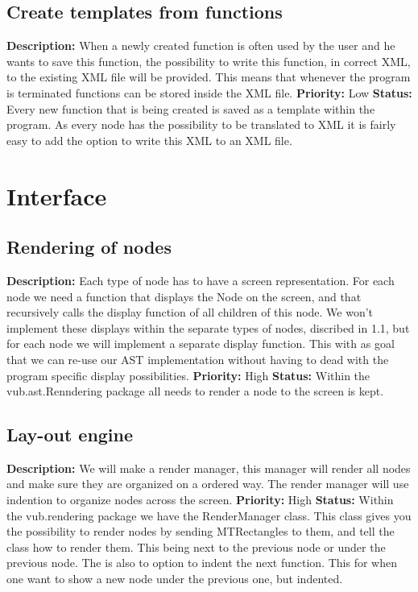 \documentclass[a4paper,12pt]{report}
\begin{document}
\subsection{Create templates from functions}
\textbf{Description: } When a newly created function is often used by the user and he wants to save this function, the possibility to write this function, in correct XML, to
the existing XML file will be provided. This means that whenever the program is terminated functions can be stored inside the XML file.\newline
\textbf{Priority:} Low \newline
\textbf{Status: } Every new function that is being created is saved as a template within the program. As every node has the possibility to be translated to XML it is fairly easy to add the option to write this XML to 
an XML file.\newline
\section{Interface}
\subsection{Rendering of nodes}
\textbf{Description: }Each type of node has to have a screen representation. For each node we need a function that displays the Node on the screen, and 
that recursively calls the display function of all children of this node. We won't implement these displays within the separate types of nodes, discribed in 1.1, but 
for each node we will implement a separate display function. This with as goal that we can re-use our AST implementation without having to dead
with the program specific display possibilities.  \newline
\textbf{Priority:} High \newline
\textbf{Status: } Within the vub.ast.Renndering package all needs to render a node to the screen is kept. \newline
\subsection{Lay-out engine}
\textbf{Description: } We will make a render manager, this manager will render all nodes and make sure they are organized on a ordered way. The render manager will use
indention to organize nodes across the screen.
\textbf{Priority:} High \newline
\textbf{Status: } Within the vub.rendering package we have the RenderManager class. This class gives you the possibility to render nodes
by sending MTRectangles to them, and tell the class how to render them. This being next to the previous node or under the previous node. 
The is also to option to indent the next function. This for when one want to show a new node under the previous one, but indented. \newline
\end{document}
